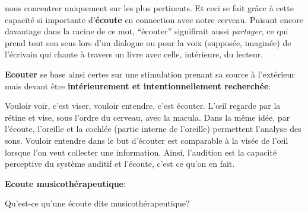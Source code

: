 nous concentrer uniquement sur les plus  pertinents. Et ceci se fait grâce à cette capacité si importante
d'\textbf{écoute} en connection avec notre cerveau.
Puisant encore davantage dans  la racine de ce mot, ``écouter'' signifirait
aussi \emph{partager}, ce qui prend tout son sens lors d'un dialogue ou
pour la voix (supposée, imaginée) de  l'écrivain qui
 chante à travers un livre avec celle, intérieure, du lecteur.


  \textbf{Ecouter} se base ainsi certes sur une stimulation prenant sa source à
l'extérieur mais devant être \textbf{ intérieurement et intentionnellement
	recherchée}:

  Vouloir voir, c'est viser, vouloir entendre, c'est
      écouter.
  L'\oe il regarde par la rétine et  vise, sous l'ordre du
  cerveau, avec la macula. Dans la même idée, par l'écoute,
  l'oreille et la cochlée (partie interne de l'oreille) permettent
  l'analyse des sons. Vouloir entendre dans le but d'écouter est comparable  à
  la visée de l'\oe il lorsque l'on veut collecter une
  information.
   Ainsi, l'audition est la capacité perceptive du système auditif et l'écoute, c'est ce qu'on en fait.


      \textbf{Ecoute musicothérapeutique}:


Qu'est-ce qu'une écoute dite musicothérapeutique?

